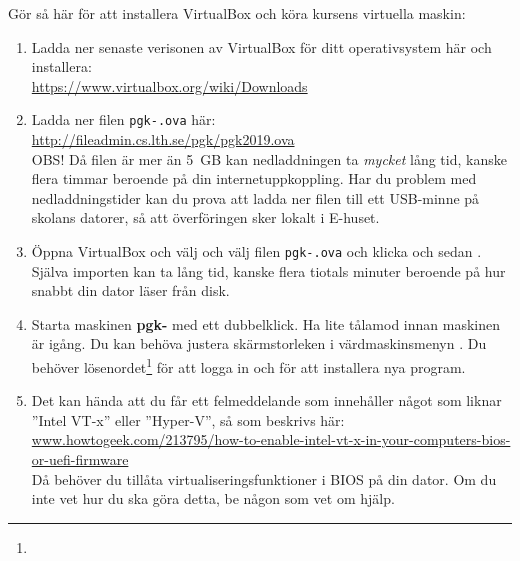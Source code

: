 Gör så här för att installera VirtualBox och köra kursens virtuella maskin:
\begin{enumerate}
\item  Ladda ner senaste verisonen av VirtualBox för ditt operativsystem här och installera: \\ \url{https://www.virtualbox.org/wiki/Downloads}


\item     Ladda ner filen \texttt{pgk-\VMName.ova} här: \\ \url{http://fileadmin.cs.lth.se/pgk/pgk2019.ova} \\ OBS! Då filen är mer än 5~GB kan nedladdningen ta \textit{mycket} lång tid, kanske flera timmar beroende på din internetuppkoppling. Har du problem med nedladdningstider kan du prova att ladda ner filen till ett USB-minne på skolans datorer, så att överföringen sker lokalt i E-huset.

\item     Öppna VirtualBox och välj  och välj filen \texttt{pgk-\VMName.ova} och klicka  och sedan . Själva importen kan ta lång tid, kanske flera tiotals minuter beroende på hur snabbt din dator läser från disk.

\item Starta maskinen \textbf{pgk-\VMName} med ett dubbelklick. Ha lite tålamod innan maskinen är igång. Du kan behöva justera skärmstorleken i värdmaskinsmenyn . Du  behöver lösenordet\footnote{} för att logga in och för att installera nya program. 

\item Det kan hända att du får ett felmeddelande som innehåller något som liknar ''Intel VT-x'' eller ''Hyper-V'', så som beskrivs här:
\\ \href{http://www.howtogeek.com/213795/how-to-enable-intel-vt-x-in-your-computers-bios-or-uefi-firmware/}{www.howtogeek.com/213795/how-to-enable-intel-vt-x-in-your-computers-bios-or-uefi-firmware}\\
Då behöver du tillåta virtualiseringsfunktioner i BIOS på din dator. Om du inte vet hur du ska göra detta, be någon som vet om hjälp.


\end{enumerate}
